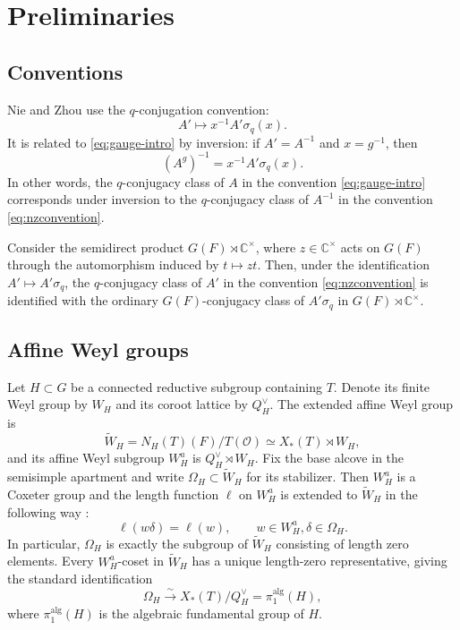 \documentclass[11pt]{amsart}
\numberwithin{equation}{section}
\theoremstyle{definition}
\theoremstyle{remark}
\begin{document}
\section{Preliminaries}\label{sec:preliminaries}
\subsection{Conventions}
Nie and Zhou \cite{NZ} use the $q$-conjugation convention:
\begin{equation}\label{eq:nzconvention}
A'\longmapsto x^{-1}A'\sigma_q(x).
\end{equation}
It is related to \eqref{eq:gauge-intro} by inversion: if $A'=A^{-1}$ and $x=g^{-1}$, then
\begin{equation}\label{eq:conventions}
  (A^g)^{-1}=x^{-1}A'\sigma_q(x).
\end{equation}
In other words, the $q$-conjugacy class of $A$ in the convention \eqref{eq:gauge-intro} corresponds under inversion to the $q$-conjugacy class of $A^{-1}$ in the convention \eqref{eq:nzconvention}.

Consider the semidirect product $G(F)\rtimes\mathbb{C}^\times$, where $z\in\mathbb{C}^\times$ acts on $G(F)$ through
the automorphism induced by $t\mapsto zt$. Then, under the identification $A'\mapsto A'\sigma_q$, the $q$-conjugacy class of $A'$ in the convention \eqref{eq:nzconvention} is identified with the ordinary $G(F)$-conjugacy class of $A'\sigma_q$ in $G(F)\rtimes\mathbb{C}^\times$.
\subsection{Affine Weyl groups}

Let $H\subset G$ be a connected reductive subgroup containing $T$.
Denote its finite Weyl group by $W_H$ and its coroot lattice by
$Q_H^\vee$.  The extended affine Weyl group is
\[
  \widetilde W_H=N_H(T)(F)/T(\mathcal O)
  \simeq X_*(T)\rtimes W_H,
\]
and its affine Weyl subgroup $W_H^a$ is $Q_H^\vee\rtimes W_H$. Fix the base alcove in the semisimple apartment and write
$\Omega_H\subset\widetilde W_H$ for its stabilizer. Then $W_H^a$ is a Coxeter group and the length function $\ell$ on $W_H^a$ is extended to $\widetilde W_H$ in the following way \cite[Section~1]{HN}:
\[
    \ell(w\delta)=\ell(w), \qquad w\in W_{H}^a, \delta\in\Omega_H.
\]
In particular, $\Omega_H$ is exactly the subgroup of $\widetilde W_H$ consisting of length zero elements.
Every $W_H^a$-coset in $\widetilde W_H$ 
has a unique length-zero representative, giving the standard identification
\begin{equation}\label{eq:omega-pi1}
  \Omega_H\xrightarrow{\sim}
  X_*(T)/Q_H^\vee=\pi_1^{\mathrm{alg}}(H),
\end{equation}
where $\pi_1^{\mathrm{alg}}(H)$ is the algebraic fundamental group of $H$.
\end{document}
